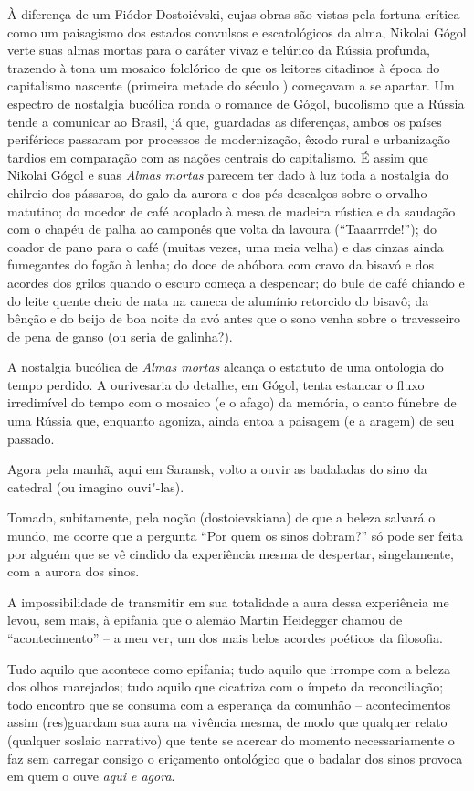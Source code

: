 À diferença de um Fiódor Dostoiévski, cujas obras são vistas pela
fortuna crítica como um paisagismo dos estados convulsos e escatológicos
da alma, Nikolai Gógol verte suas almas mortas para o caráter vivaz e
telúrico da Rússia profunda, trazendo à tona um mosaico folclórico de
que os leitores citadinos à época do capitalismo nascente (primeira
metade do século ) começavam a se apartar. Um espectro de nostalgia
bucólica ronda o romance de Gógol, bucolismo que a Rússia tende a
comunicar ao Brasil, já que, guardadas as diferenças, ambos os países
periféricos passaram por processos de modernização, êxodo rural e
urbanização tardios em comparação com as nações centrais do capitalismo.
É assim que Nikolai Gógol e suas \emph{Almas mortas} parecem ter dado à
luz toda a nostalgia do chilreio dos pássaros, do galo da aurora e dos
pés descalços sobre o orvalho matutino; do moedor de café acoplado à
mesa de madeira rústica e da saudação com o chapéu de palha ao camponês
que volta da lavoura (``Taaarrrde!''); do coador de pano para o café
(muitas vezes, uma meia velha) e das cinzas ainda fumegantes do fogão à
lenha; do doce de abóbora com cravo da bisavó e dos acordes dos grilos
quando o escuro começa a despencar; do bule de café chiando e do leite
quente cheio de nata na caneca de alumínio retorcido do bisavô; da
bênção e do beijo de boa noite da avó antes que o sono venha sobre o
travesseiro de pena de ganso (ou seria de galinha?).

A nostalgia bucólica de \emph{Almas mortas} alcança o estatuto de uma
ontologia do tempo perdido. A ourivesaria do detalhe, em Gógol, tenta
estancar o fluxo irredimível do tempo com o mosaico (e o afago) da
memória, o canto fúnebre de uma Rússia que, enquanto agoniza, ainda
entoa a paisagem (e a aragem) de seu passado.

Agora pela manhã, aqui em Saransk, volto a ouvir as badaladas do sino da
catedral (ou imagino ouvi"-las).

Tomado, subitamente, pela noção (dostoievskiana) de que a beleza salvará
o mundo, me ocorre que a pergunta ``Por quem os sinos dobram?'' só pode
ser feita por alguém que se vê cindido da experiência mesma de
despertar, singelamente, com a aurora dos sinos.

A impossibilidade de transmitir em sua totalidade a aura dessa
experiência me levou, sem mais, à epifania que o alemão Martin Heidegger
chamou de ``acontecimento'' -- a meu ver, um dos mais belos acordes
poéticos da filosofia.

Tudo aquilo que acontece como epifania; tudo aquilo que irrompe com a
beleza dos olhos marejados; tudo aquilo que cicatriza com o ímpeto da
reconciliação; todo encontro que se consuma com a esperança da comunhão
-- acontecimentos assim (res)guardam sua aura na vivência mesma, de modo
que qualquer relato (qualquer soslaio narrativo) que tente se acercar do
momento necessariamente o faz sem carregar consigo o eriçamento
ontológico que o badalar dos sinos provoca em quem o ouve \emph{aqui e
agora}.

